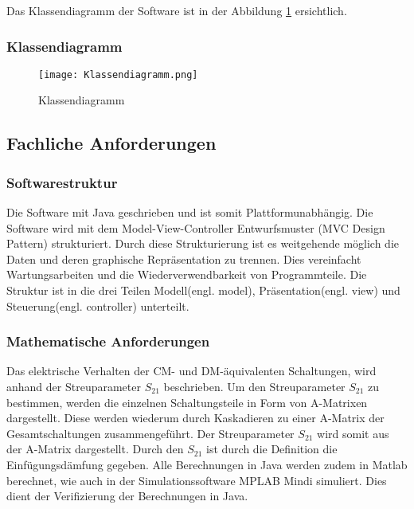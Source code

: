 Das Klassendiagramm der Software ist in der Abbildung \ref{fig:Klassendiagramm} ersichtlich.

\newpage

\subsubsection{Klassendiagramm} \label{subsubsec:Klassendiagramm}

\begin{figure}[H]
	\centering
	\texttt{[image: Klassendiagramm.png]}
	\caption{Klassendiagramm}
	\label{fig:Klassendiagramm}
\end{figure} 

\newpage

\subsection{Fachliche Anforderungen} \label{subsubsec:fachlicheanforderungen}

\bigskip
{}
\subsubsection{Softwarestruktur} \label{subsubsec:Softwarestruktur}
Die Software mit Java geschrieben und ist somit Plattformunabhängig. Die Software wird mit dem Model-View-Controller Entwurfsmuster (MVC Design Pattern) \cite{MVCDesignPattern} strukturiert. Durch diese Strukturierung ist es weitgehende möglich die Daten und deren graphische Repräsentation zu trennen. Dies vereinfacht Wartungsarbeiten und die Wiederverwendbarkeit von Programmteile. Die Struktur ist in die drei Teilen Modell(engl. model), Präsentation(engl. view) und Steuerung(engl. controller) unterteilt.

\bigskip
\subsubsection{Mathematische Anforderungen}\label{subsubsec:mathematischeanforderungen}
Das elektrische Verhalten der CM- und DM-äquivalenten Schaltungen, wird anhand der Streuparameter $S_{21}$ beschrieben. Um den Streuparameter $S_{21}$ zu bestimmen, werden die einzelnen Schaltungsteile in Form von A-Matrixen dargestellt. Diese werden wiederum durch Kaskadieren zu einer A-Matrix der Gesamtschaltungen  zusammengeführt. Der Streuparameter $S_{21}$ wird somit aus der A-Matrix dargestellt. Durch den $S_{21}$ ist durch die Definition die Einfügungsdämfung gegeben. Alle Berechnungen in Java werden zudem in Matlab berechnet, wie auch in der Simulationssoftware MPLAB Mindi simuliert. Dies dient der Verifizierung der Berechnungen in Java.
\bigskip
